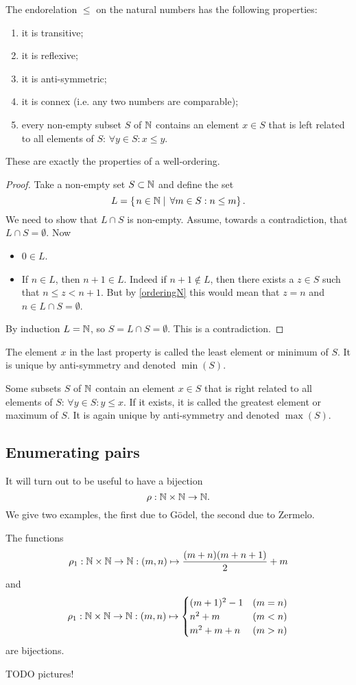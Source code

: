 \begin{proposition} \label{proposition:wellOrderingN}
The endorelation $\leq$ on the natural numbers has the following properties:
\begin{enumerate}
\item it is transitive;
\item it is reflexive;
\item it is anti-symmetric;
\item it is connex (i.e. any two numbers are comparable);
\item every non-empty subset $S$ of $\mathbb{N}$ contains an element $x\in S$ that is left related to all elements of $S$: $\forall y\in S: x\leq y$.
\end{enumerate}
These are exactly the properties of a well-ordering.
\end{proposition}
\begin{proof}
Take a non-empty set $S\subset \mathbb{N}$ and define the set
\[ L = \left\{\left. n\in\mathbb{N} \;\right|\; \forall m\in S: n\leq m \right\}. \]
We need to show that $L\cap S$ is non-empty. Assume, towards a contradiction, that $L\cap S = \emptyset$.
Now
\begin{itemize}
\item $0\in L$.
\item If $n\in L$, then $n+1\in L$. Indeed if $n+1 \notin L$, then there exists a $z\in S$ such that $n\leq z<n+1$. But by \ref{orderingN} this would mean that $z=n$ and $n\in L\cap S = \emptyset$.
\end{itemize}
By induction $L=\mathbb{N}$, so $S = L\cap S = \emptyset$. This is a contradiction.
\end{proof}


The element $x$ in the last property is called the least element or minimum of $S$. It is unique by anti-symmetry and denoted $\min(S)$.

Some subsets $S$ of $\mathbb{N}$ contain an element $x\in S$ that is right related to all elements of $S$: $\forall y\in S: y\leq x$. If it exists, it is called the greatest element or maximum of $S$. It is again unique by anti-symmetry and denoted $\max(S)$.

\subsection{Enumerating pairs}
It will turn out to be useful to have a bijection
\[ \rho: \mathbb{N}\times \mathbb{N} \to \mathbb{N}. \]
We give two examples, the first due to Gödel, the second due to Zermelo.
\begin{lemma} \label{pairEnumeration}
The functions
\[\rho_1 : \mathbb{N}\times\mathbb{N} \to \mathbb{N}: (m,n)\mapsto \frac{(m+n)(m+n+1)}{2}+m \]
and
\[ \rho_1 : \mathbb{N}\times\mathbb{N} \to \mathbb{N}: (m,n)\mapsto \begin{cases}
(m+1)^2-1 & (m=n) \\
n^2 + m & (m<n) \\
m^2+m+n & (m>n)
\end{cases} \]
are bijections.
\end{lemma}
TODO pictures!
